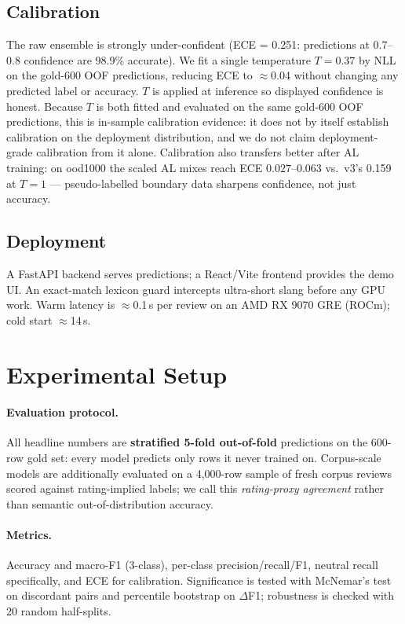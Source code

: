\documentclass[11pt,a4paper]{article}
\begin{document}
\subsection{Calibration}
\label{sec:calib}

The raw ensemble is strongly under-confident (ECE = 0.251: predictions
at 0.7--0.8 confidence are 98.9\% accurate). We fit a single temperature
$T = 0.37$ by NLL on the gold-600 OOF predictions, reducing ECE to
$\approx$0.04 without changing any predicted label or accuracy. $T$ is
applied at inference so displayed confidence is honest. Because $T$ is
both fitted and evaluated on the same gold-600 OOF predictions, this is
in-sample calibration evidence: it does not by itself establish
calibration on the deployment distribution, and we do not claim
deployment-grade calibration from it alone. Calibration
also transfers better after AL training: on ood1000 the scaled AL
mixes reach ECE $0.027$--$0.063$ vs.\ v3's 0.159 at $T{=}1$ ---
pseudo-labelled boundary data sharpens confidence, not just accuracy.

\subsection{Deployment}
\label{sec:deploy}

A FastAPI backend serves predictions; a React/Vite frontend provides the
demo UI. An exact-match lexicon guard intercepts ultra-short slang
before any GPU work. Warm latency is $\approx$0.1\,s per review on an
AMD RX 9070 GRE (ROCm); cold start $\approx$14\,s.

\section{Experimental Setup}
\label{sec:setup}

\paragraph{Evaluation protocol.} All headline numbers are
\textbf{stratified 5-fold out-of-fold} predictions on the 600-row gold
set: every model predicts only rows it never trained on. Corpus-scale
models are additionally evaluated on a 4{,}000-row sample of fresh
corpus reviews scored against rating-implied labels; we call this
\emph{rating-proxy agreement} rather than semantic out-of-distribution
accuracy.

\paragraph{Metrics.} Accuracy and macro-F1 (3-class), per-class
precision/recall/F1, neutral recall specifically, and ECE for
calibration. Significance is tested with McNemar's test on discordant
pairs and percentile bootstrap on $\Delta$F1; robustness is checked
with 20 random half-splits.
\end{document}
